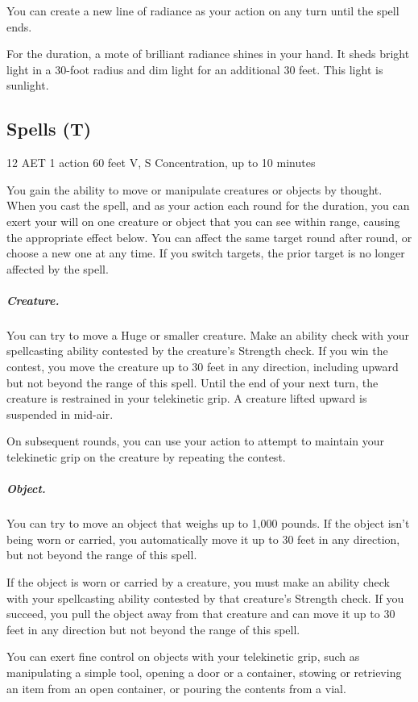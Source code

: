 You can create a new line of radiance as your action on any turn until the spell ends.

For the duration, a mote of brilliant radiance shines in your hand. It sheds bright light in a 30-foot radius and dim light for an additional 30 feet. This light is sunlight.

\subsection{Spells (T)}


{12 AET}
{1 action}
{60 feet}
{V, S}
{Concentration, up to 10 minutes}

You gain the ability to move or manipulate creatures or objects by thought. When you cast the spell, and as your action each round for the duration, you can exert your will on one creature or object that you can see within range, causing the appropriate effect below. You can affect the same target round after round, or choose a new one at any time. If you switch targets, the prior target is no longer affected by the spell.

\subparagraph*{Creature.} You can try to move a Huge or smaller creature. Make an ability check with your spellcasting ability contested by the creature's Strength check. If you win the contest, you move the creature up to 30 feet in any direction, including upward but not beyond the range of this spell. Until the end of your next turn, the creature is restrained in your telekinetic grip. A creature lifted upward is suspended in mid-air.

On subsequent rounds, you can use your action to attempt to maintain your telekinetic grip on the creature by repeating the contest.

\subparagraph*{Object.} You can try to move an object that weighs up to 1,000 pounds. If the object isn't being worn or carried, you automatically move it up to 30 feet in any direction, but not beyond the range of this spell.

If the object is worn or carried by a creature, you must make an ability check with your spellcasting ability contested by that creature's Strength check. If you succeed, you pull the object away from that creature and can move it up to 30 feet in any direction but not beyond the range of this spell.

You can exert fine control on objects with your telekinetic grip, such as manipulating a simple tool, opening a door or a container, stowing or retrieving an item from an open container, or pouring the contents from a vial.


